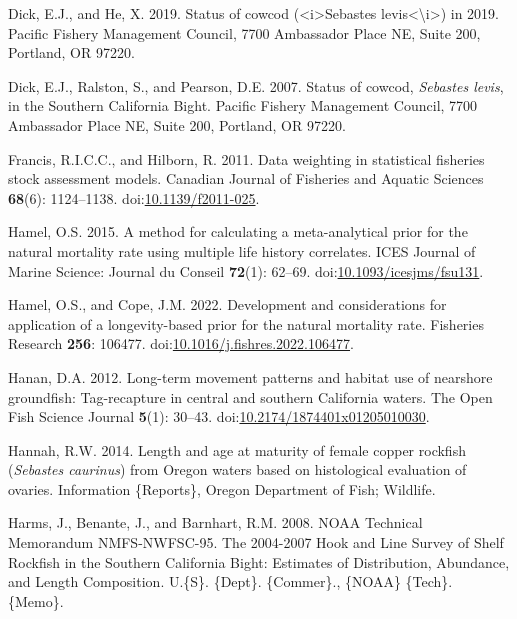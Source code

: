\documentclass[11pt,
  english,
  letterpaper,
]{article}
\newlength{\cslhangindent}
\newenvironment{CSLReferences}[2] %
 {%
  \setlength{\parindent}{0pt}
  \ifodd #1 \everypar{\setlength{\hangindent}{\cslhangindent}}\ignorespaces\fi
  \ifnum #2 > 0
  \setlength{\parskip}{#2\baselineskip}
  \fi
 }%
 {}
\begin{document}
\begin{CSLReferences}{1}{0}
\leavevmode{}%
Dick, E.J., and He, X. 2019. Status of cowcod ({\textless{}}i{\textgreater{}}{Sebastes} levis{\textless{}}{\textbackslash{}}i{\textgreater{}}) in 2019. Pacific Fishery Management Council, 7700 Ambassador Place NE, Suite 200, Portland, OR 97220.

\leavevmode{}%
Dick, E.J., Ralston, S., and Pearson, D.E. 2007. Status of cowcod, \emph{{Sebastes} levis}, in the {Southern} {California} {Bight}. Pacific Fishery Management Council, 7700 Ambassador Place NE, Suite 200, Portland, OR 97220.

\leavevmode{}%
Francis, R.I.C.C., and Hilborn, R. 2011. Data weighting in statistical fisheries stock assessment models. Canadian Journal of Fisheries and Aquatic Sciences \textbf{68}(6): 1124--1138. doi:\href{https://doi.org/10.1139/f2011-025}{10.1139/f2011-025}.

\leavevmode{}%
Hamel, O.S. 2015. A method for calculating a meta-analytical prior for the natural mortality rate using multiple life history correlates. ICES Journal of Marine Science: Journal du Conseil \textbf{72}(1): 62--69. doi:\href{https://doi.org/10.1093/icesjms/fsu131}{10.1093/icesjms/fsu131}.

\leavevmode{}%
Hamel, O.S., and Cope, J.M. 2022. Development and considerations for application of a longevity-based prior for the natural mortality rate. Fisheries Research \textbf{256}: 106477. doi:\href{https://doi.org/10.1016/j.fishres.2022.106477}{10.1016/j.fishres.2022.106477}.

\leavevmode{}%
Hanan, D.A. 2012. Long-term movement patterns and habitat use of nearshore groundfish: Tag-recapture in central and southern {California} waters. The Open Fish Science Journal \textbf{5}(1): 30--43. doi:\href{https://doi.org/10.2174/1874401x01205010030}{10.2174/1874401x01205010030}.

\leavevmode{}%
Hannah, R.W. 2014. Length and age at maturity of female copper rockfish (\emph{{Sebastes} caurinus}) from {Oregon} waters based on histological evaluation of ovaries. Information \{Reports\}, Oregon Department of Fish; Wildlife.

\leavevmode{}%
Harms, J., Benante, J., and Barnhart, R.M. 2008. {NOAA} {Technical} {Memorandum} {NMFS}-{NWFSC}-95. {The} 2004-2007 {Hook} and {Line} {Survey} of {Shelf} {Rockfish} in the {Southern} {California} {Bight}: {Estimates} of {Distribution}, {Abundance}, and {Length} {Composition}. U.\{S\}. \{Dept\}. \{Commer\}., \{NOAA\} \{Tech\}. \{Memo\}.


\end{CSLReferences}
\end{document}
